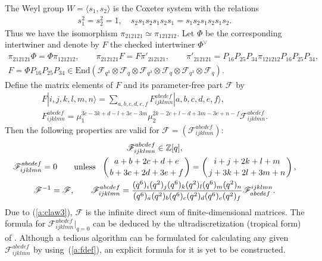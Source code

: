 \documentclass[11pt]{article}
\begin{document}
The Weyl group $W =\langle s_1, s_2 \rangle$ is the Coxeter system
with the relations
\begin{gather*}
s_1^2=s_2^2=1,\quad
s_2s_1s_2s_1s_2s_1 = s_1s_2s_1s_2s_1s_2.
\end{gather*}
Thus we have the isomorphism
$\pi_{212121} \simeq \pi_{121212}$.
Let $\Phi$ be the corresponding intertwiner and denote by $F$
the checked intertwiner $\Phi^\vee$
\begin{gather}
 \pi_{212121} \Phi = \Phi\pi_{121212},\qquad
\pi_{212121} F = F \pi'_{212121},\qquad
\pi'_{212121}
= P_{16}P_{25}P_{34}\pi_{121212}P_{16}P_{25}P_{34},\nonumber
\\
F = \Phi  P_{16}P_{25}P_{34}\in
\mathrm{End}(\mathcal{F}_{q^3}\otimes
\mathcal{F}_{q}\otimes
\mathcal{F}_{q^3}\otimes
\mathcal{F}_{q}\otimes
\mathcal{F}_{q^3}\otimes
\mathcal{F}_{q}).\label{a:fdef}
\end{gather}
Def\/ine the matrix elements of $F$ and its parameter-free part
$\mathscr{F}$ by
\begin{gather*}
F |i,j,k,l,m,n \rangle=
\sum_{a,b,c,d,e,f}F^{abcdef}_{ijklmn}|a,b,c,d,e,f \rangle,\\
F^{a b c d e f}_{i j k l m n} =
\mu_1^{3c-3k+d-l+3e-3m}
\mu_2^{2k-2c+l-d+3m-3e+n-f}
\mathscr{F}^{a b c d e f}_{i j k l m n}.
\end{gather*}
Then the following properties are valid for
$\mathscr{F} = (\mathscr{F}^{abcdef}_{ijklmn})$:
\begin{gather}
\mathscr{F}^{abcdef}_{ijklmn} \in \mathbb{Z}[q],\nonumber\\
\mathscr{F}^{abcdef}_{ijklmn}=0 \qquad \mathrm{unless}\ \
\left({a + b + 2c + d + e \atop b + 3c + 2d + 3e + f}\right)=
\left({i + j + 2k + l + m\atop j + 3k + 2l + 3m + n}\right),
\label{a:claw3}\\
\mathscr{F}^{-1} = \mathscr{F},\qquad
\mathscr{F}^{abcdef}_{ijklmn}
=\frac{(q^6)_i(q^2)_j(q^6)_k(q^2)_l(q^6)_m(q^2)_n}
{(q^6)_a(q^2)_b(q^6)_c(q^2)_d(q^6)_e(q^2)_f}
\mathscr{F}^{ijklmn}_{abcdef}.
\label{a:fprop}
\end{gather}
Due to (\ref{a:claw3}), $\mathscr{F}$ is the inf\/inite direct sum
of f\/inite-dimensional matrices.
The formula for $\mathscr{F}^{abcdef}_{ijklmn}|_{q=0}$
can be deduced by the ultradiscretization (tropical form) of \cite[Theorem~3.1(c)]{BZ97}.
Although a tedious algorithm can be formulated
for calculating any given $\mathscr{F}^{abcdef}_{ijklmn}$ by using~(\ref{a:fdef}),
an explicit formula for it is yet to be constructed.
\end{document}
